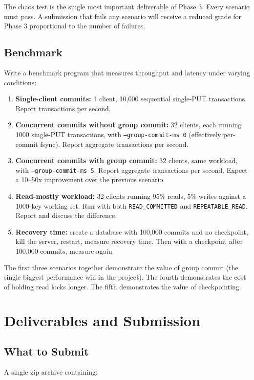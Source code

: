 \documentclass[11pt,a4paper]{article}
\begin{document}
The chaos test is the single most important deliverable of Phase 3. Every scenario must pass. A submission that fails any scenario will receive a reduced grade for Phase 3 proportional to the number of failures.

\subsection{Benchmark}
Write a benchmark program that measures throughput and latency under varying conditions:

\begin{enumerate}
\item \textbf{Single-client commits:} 1 client, 10{,}000 sequential single-PUT transactions. Report transactions per second.

\item \textbf{Concurrent commits without group commit:} 32 clients, each running 1000 single-PUT transactions, with \texttt{--group-commit-ms 0} (effectively per-commit fsync). Report aggregate transactions per second.

\item \textbf{Concurrent commits with group commit:} 32 clients, same workload, with \texttt{--group-commit-ms 5}. Report aggregate transactions per second. Expect a 10--50x improvement over the previous scenario.

\item \textbf{Read-mostly workload:} 32 clients running 95\% reads, 5\% writes against a 1000-key working set. Run with both \texttt{READ\_COMMITTED} and \texttt{REPEATABLE\_READ}. Report and discuss the difference.

\item \textbf{Recovery time:} create a database with 100{,}000 commits and no checkpoint, kill the server, restart, measure recovery time. Then with a checkpoint after 100{,}000 commits, measure again.
\end{enumerate}

The first three scenarios together demonstrate the value of group commit (the single biggest performance win in the project). The fourth demonstrates the cost of holding read locks longer. The fifth demonstrates the value of checkpointing.

\section{Deliverables and Submission}

\subsection{What to Submit}
A single zip archive containing:
\end{document}
